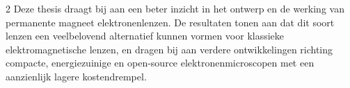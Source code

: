 \documentclass[we,twoside,openright,a4paper,11pt]{uantwerpenbamathesis}
\begin{document}
\begin{multicols}{2}
Deze thesis draagt bij aan een beter inzicht in het ontwerp en de werking van permanente magneet elektronenlenzen. De resultaten tonen aan dat dit soort lenzen een veelbelovend alternatief kunnen vormen voor klassieke elektromagnetische lenzen, en dragen bij aan verdere ontwikkelingen richting compacte, energiezuinige en open-source elektronenmicroscopen met een aanzienlijk lagere kostendrempel.




\end{multicols}
\end{document}
